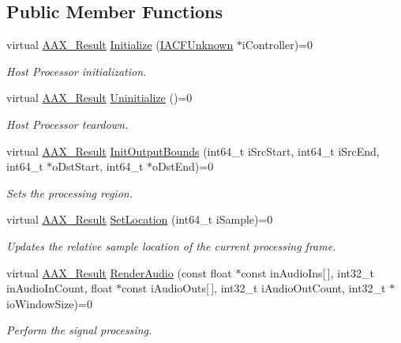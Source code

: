 \subsection*{Public Member Functions}
\begin{DoxyCompactItemize}
\item 
virtual \hyperlink{a00149_a4d8f69a697df7f70c3a8e9b8ee130d2f}{A\+A\+X\+\_\+\+Result} \hyperlink{a00066_a00aa7da380e86cd79c6b8da1aa51c3b7}{Initialize} (\hyperlink{a00146}{I\+A\+C\+F\+Unknown} $\ast$i\+Controller)=0
\begin{DoxyCompactList}\small\item\em Host Processor initialization. \end{DoxyCompactList}\item 
virtual \hyperlink{a00149_a4d8f69a697df7f70c3a8e9b8ee130d2f}{A\+A\+X\+\_\+\+Result} \hyperlink{a00066_a238fc3fee9180cd52df2c87180f4a656}{Uninitialize} ()=0
\begin{DoxyCompactList}\small\item\em Host Processor teardown. \end{DoxyCompactList}\item 
virtual \hyperlink{a00149_a4d8f69a697df7f70c3a8e9b8ee130d2f}{A\+A\+X\+\_\+\+Result} \hyperlink{a00066_a157bab3b949dc98f02e66c907c419bad}{Init\+Output\+Bounds} (int64\+\_\+t i\+Src\+Start, int64\+\_\+t i\+Src\+End, int64\+\_\+t $\ast$o\+Dst\+Start, int64\+\_\+t $\ast$o\+Dst\+End)=0
\begin{DoxyCompactList}\small\item\em Sets the processing region. \end{DoxyCompactList}\item 
virtual \hyperlink{a00149_a4d8f69a697df7f70c3a8e9b8ee130d2f}{A\+A\+X\+\_\+\+Result} \hyperlink{a00066_ae9bd1a23f31701d3de6d9d410c819c81}{Set\+Location} (int64\+\_\+t i\+Sample)=0
\begin{DoxyCompactList}\small\item\em Updates the relative sample location of the current processing frame. \end{DoxyCompactList}\item 
virtual \hyperlink{a00149_a4d8f69a697df7f70c3a8e9b8ee130d2f}{A\+A\+X\+\_\+\+Result} \hyperlink{a00066_a8ede94912e89621bf6951042687c3c4a}{Render\+Audio} (const float $\ast$const in\+Audio\+Ins\mbox{[}$\,$\mbox{]}, int32\+\_\+t in\+Audio\+In\+Count, float $\ast$const i\+Audio\+Outs\mbox{[}$\,$\mbox{]}, int32\+\_\+t i\+Audio\+Out\+Count, int32\+\_\+t $\ast$io\+Window\+Size)=0
\begin{DoxyCompactList}\small\item\em Perform the signal processing. \end{DoxyCompactList}\item 

\end{DoxyCompactItemize}
